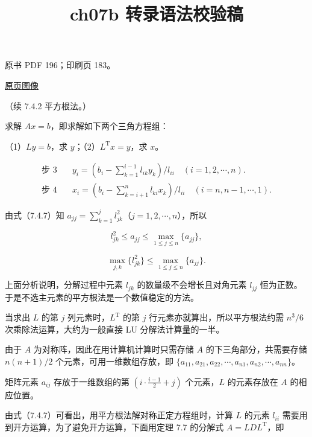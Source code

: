 \documentclass[
  10pt,
  fontset=fandol]{ctexart}
\title{ch07b 转录语法校验稿}
\author{}
\date{}
\begin{document}
\maketitle

\clearpage

原书 PDF 196；印刷页 183。

\href{/Users/xiangjunfeng/Desktop/数值计算专用/numerical-analysis/book/source-images/pdf-196.jpeg}{原页图像}

（续 7.4.2 平方根法。）

求解 \(Ax=b\)，即求解如下两个三角方程组：

（1）\(Ly=b\)，求 \(y\)；（2）\(L^{\mathrm T}x=y\)，求 \(x\)。

\[
\begin{aligned}
\text{步 3}\quad &y_i=\left(b_i-\sum_{k=1}^{i-1}l_{ik}y_k\right)/l_{ii}\quad(i=1,2,\cdots,n).\\
\text{步 4}\quad &x_i=\left(b_i-\sum_{k=i+1}^{n}l_{ki}x_k\right)/l_{ii}\quad(i=n,n-1,\cdots,1).
\end{aligned}
\tag{7.4.8}
\]

由式（7.4.7）知
\(a_{jj}=\sum_{k=1}^{j}l_{jk}^{2}\)（\(j=1,2,\cdots,n\)），所以

\[
l_{jk}^{2}\leqslant a_{jj}\leqslant\max_{1\leqslant j\leqslant n}\{a_{jj}\},
\]

\[
\max_{j,k}\{l_{jk}^{2}\}\leqslant\max_{1\leqslant j\leqslant n}\{a_{jj}\}.
\]

上面分析说明，分解过程中元素 \(l_{jk}\) 的数量级不会增长且对角元素
\(l_{jj}\) 恒为正数。于是不选主元素的平方根法是一个数值稳定的方法。

当求出 \(L\) 的第 \(j\) 列元素时，\(L^{\mathrm T}\) 的第 \(j\)
行元素亦就算出，所以平方根法约需 \(n^3/6\) 次乘除法运算，大约为一般直接
LU 分解法计算量的一半。

由于 \(A\) 为对称阵，因此在用计算机计算时只需存储 \(A\)
的下三角部分，共需要存储 \(n(n+1)/2\) 个元素，可用一维数组存放，即
\(\{a_{11},a_{21},a_{22},\cdots,a_{n1},a_{n2},\cdots,a_{nn}\}\)。

矩阵元素 \(a_{ij}\) 存放于一维数组的第
\(\left(i\cdot\frac{i-1}{2}+j\right)\) 个元素，\(L\) 的元素存放在 \(A\)
的相应位置。

由式（7.4.7）可看出，用平方根法解对称正定方程组时，计算 \(L\) 的元素
\(l_{ii}\) 需要用到开方运算，为了避免开方运算，下面用定理 7.7 的分解式
\(A=LDL^{\mathrm T}\)，即
\end{document}
